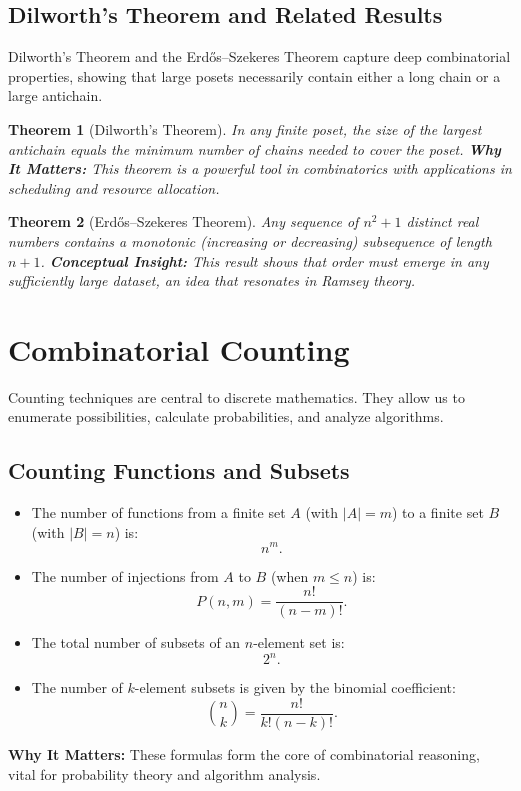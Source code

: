 \documentclass[12pt]{article}
\newtheorem{theorem}{Theorem}[section]
\theoremstyle{definition}
\begin{document}
\subsection{Dilworth's Theorem and Related Results}

Dilworth's Theorem and the Erd\H{o}s--Szekeres Theorem capture deep combinatorial properties, showing that large posets necessarily contain either a long chain or a large antichain.

\begin{theorem}[Dilworth's Theorem]
  In any finite poset, the size of the largest antichain equals the minimum number of chains needed to cover the poset.
  \vspace{0.5em}
  \textbf{Why It Matters:} This theorem is a powerful tool in combinatorics with applications in scheduling and resource allocation.
\end{theorem}

\begin{theorem}[Erd\H{o}s--Szekeres Theorem]
  Any sequence of \(n^2+1\) distinct real numbers contains a monotonic (increasing or decreasing) subsequence of length \(n+1\).
  \vspace{0.5em}
  \textbf{Conceptual Insight:} This result shows that order must emerge in any sufficiently large dataset, an idea that resonates in Ramsey theory.
\end{theorem}

\section{Combinatorial Counting}

Counting techniques are central to discrete mathematics. They allow us to enumerate possibilities, calculate probabilities, and analyze algorithms.

\subsection{Counting Functions and Subsets}

\begin{itemize}
  \item The number of functions from a finite set \(A\) (with \(|A| = m\)) to a finite set \(B\) (with \(|B| = n\)) is:
  \[
  n^m.
  \]
  \item The number of injections from \(A\) to \(B\) (when \(m \le n\)) is:
  \[
  P(n, m) = \frac{n!}{(n-m)!}.
  \]
  \item The total number of subsets of an \(n\)-element set is:
  \[
  2^n.
  \]
  \item The number of \(k\)-element subsets is given by the binomial coefficient:
  \[
  \binom{n}{k} = \frac{n!}{k!(n-k)!}.
  \]
\end{itemize}
\vspace{0.5em}
\textbf{Why It Matters:} These formulas form the core of combinatorial reasoning, vital for probability theory and algorithm analysis.
\end{document}
